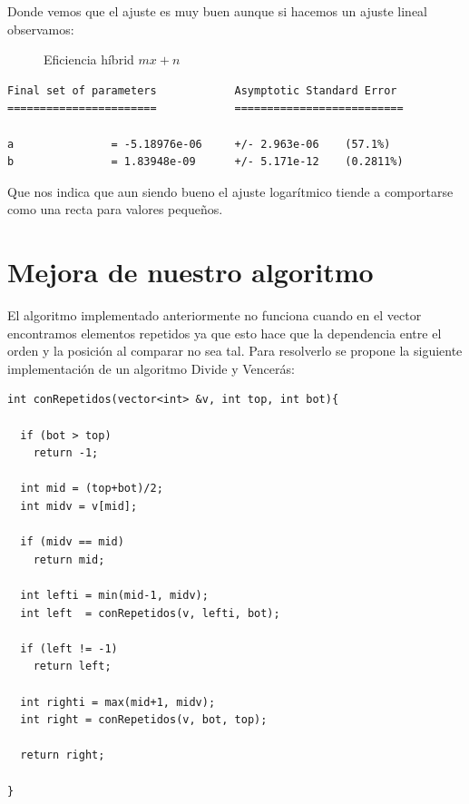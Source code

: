 \documentclass{article}
\begin{document}
Donde vemos que el ajuste es muy buen aunque si hacemos un ajuste lineal observamos: 

\begin{figure}[H]
  \centering   

\caption{Eficiencia híbrid $mx+n$}
\end{figure}

\begin{verbatim}
Final set of parameters            Asymptotic Standard Error
=======================            ==========================

a               = -5.18976e-06     +/- 2.963e-06    (57.1%)
b               = 1.83948e-09      +/- 5.171e-12    (0.2811%)

\end{verbatim}

Que nos indica que aun siendo bueno el ajuste logarítmico tiende a
comportarse como una recta para valores pequeños.

\section{Mejora de nuestro algoritmo}

El algoritmo implementado anteriormente no funciona cuando en el
vector encontramos elementos repetidos ya que esto hace que la
dependencia entre el orden y la posición al comparar no sea tal. Para
resolverlo se propone la siguiente implementación de un algoritmo
Divide y Vencerás:

\begin{lstlisting}
int conRepetidos(vector<int> &v, int top, int bot){

  if (bot > top)
    return -1;

  int mid = (top+bot)/2;
  int midv = v[mid];

  if (midv == mid)
    return mid;

  int lefti = min(mid-1, midv);
  int left  = conRepetidos(v, lefti, bot);

  if (left != -1)
    return left;

  int righti = max(mid+1, midv);
  int right = conRepetidos(v, bot, top);

  return right;
      
}
\end{lstlisting}
\end{document}
